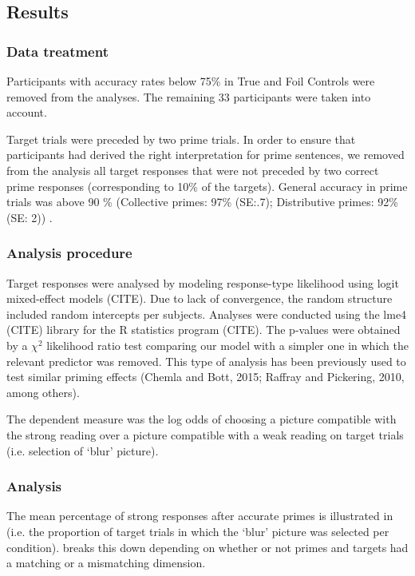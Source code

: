 \documentclass[a4paper, 11pt]{article}
\begin{document}
\subsection{Results}

\subsubsection{Data treatment}

Participants with accuracy rates below 75\% in True and Foil Controls were removed from the analyses. The remaining 33 participants were taken into account. 

Target trials were preceded by two prime trials. 
In order to ensure that participants had derived the right interpretation for prime sentences, we removed from the analysis all target responses that were not preceded by two correct prime responses (corresponding to 10\% of the targets). General accuracy in prime trials was above 90 \% (Collective primes: 97\% (SE:.7); Distributive primes: 92\%(SE: 2)) . 


\subsubsection{Analysis procedure}
Target responses were analysed by modeling response-type likelihood using logit mixed-effect models (CITE). Due to lack of convergence, the random structure included random intercepts per subjects. Analyses were conducted using the lme4 (CITE) library for the R statistics program (CITE). 
The p-values were obtained by a $\chi^{2}$ likelihood ratio test comparing our model with a simpler one in which the relevant predictor was removed. This type of analysis has been previously used to test similar priming effects (Chemla and Bott, 2015; Raffray and Pickering, 2010, among others).

The dependent measure was the log odds of choosing a picture compatible with the strong reading over a picture compatible with a weak reading on target trials (i.e. selection of `blur' picture). 


\subsubsection{Analysis}
The mean percentage of strong responses after accurate primes is illustrated in  (i.e. the proportion of target trials in which the `blur' picture was selected per condition).   breaks this down depending on whether or not primes and targets had a matching or a mismatching dimension. 
\end{document}
